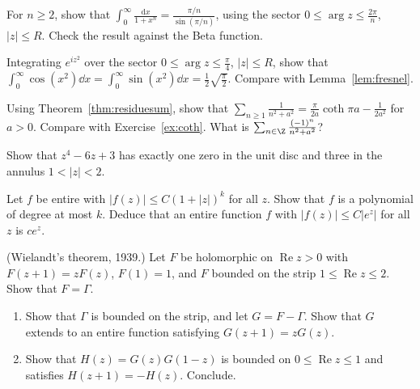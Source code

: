 \begin{exercise}[$\star\star$]\label{ex:xn}
For $n\ge2$, show that $\displaystyle\int_0^\infty\frac{\mathrm dx}{1+x^n}=\frac{\pi/n}{\sin(\pi/n)}$, using the sector $0\le\arg z\le\frac{2\pi}n$, $|z|\le R$. Check the result against the
Beta function.
\end{exercise}

\begin{exercise}[$\star\star$]\label{ex:fresnelsector}
Integrating $e^{iz^2}$ over the sector $0\le\arg z\le\frac\pi4$, $|z|\le R$, show that $\displaystyle\int_0^\infty\cos(x^2)\dd x=\int_0^\infty\sin(x^2)\dd x=\frac12\sqrt{\frac\pi2}$. Compare with
Lemma~\ref{lem:fresnel}.
\end{exercise}

\begin{exercise}[$\star$]\label{ex:cothres}
Using Theorem~\ref{thm:residuesum}, show that $\displaystyle\sum_{n\ge1}\frac1{n^2+a^2}=\frac\pi{2a}\coth\pi a-\frac1{2a^2}$ for $a>0$. Compare with Exercise~\ref{ex:coth}. What is $\sum_{n\in\Z}\frac{(-1)^n}{n^2+a^2}$?
\end{exercise}

\begin{exercise}[$\star$]\label{ex:rouche}
Show that $z^4-6z+3$ has exactly one zero in the unit disc and three in the annulus $1<|z|<2$.
\end{exercise}

\begin{exercise}[$\star\star$]\label{ex:polygrowth}
Let $f$ be entire with $|f(z)|\le C(1+|z|)^k$ for all $z$. Show that $f$ is a polynomial of degree at most $k$. Deduce that an entire function $f$
with $|f(z)|\le C|e^z|$ for all $z$ is $ce^z$.
\end{exercise}

\begin{exercise}[$\star\star\star$]\label{ex:wielandt}
(Wielandt's theorem, 1939.) Let $F$ be holomorphic on $\operatorname{Re}z>0$ with $F(z+1)=zF(z)$, $F(1)=1$, and $F$ bounded on the strip $1\le\operatorname{Re}z\le2$. Show
that $F=\Gamma$.
\begin{enumerate}[label=(\alph*)]
\item Show that $\Gamma$ is bounded on the strip, and let $G=F-\Gamma$. Show that $G$ extends to an entire function satisfying $G(z+1)=zG(z)$.
\item Show that $H(z)=G(z)G(1-z)$ is bounded on $0\le\operatorname{Re}z\le1$ and satisfies $H(z+1)=-H(z)$. Conclude.
\end{enumerate}
\end{exercise}

